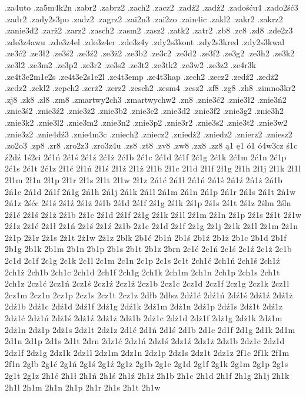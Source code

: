 {.za4uto
.za5m4k2n
.zabr2
.zabrz2
.zach2
.zacz2
.zadź2
.zadż2
.zadośću4
.zado2ść3
.zadr2
.zady2s3po
.zadz2
.zagrz2
.zai2n3
.zai2zo
.zain4ic
.zakl2
.zakr2
.zakrz2
.zanie3d2
.zarż2
.zarz2
.zasch2
.zasm2
.zasz2
.zatk2
.zatr2
.zb8
.zc8
.zd8
.zde2z3
.zde3z4awu
.zde3z4el
.zde3z4er
.zde3z4y
.zdy2s3kont
.zdy2s3kred
.zdy2s3kwal
.ze3ć2
.ze3ł2
.ze3ś2
.ze3ź2
.ze3ż2
.ze3b2
.ze3c2
.ze3d2
.ze3f2
.ze3g2
.ze3h2
.ze3k2
.ze3l2
.ze3m2
.ze3p2
.ze3r2
.ze3s2
.ze3t2
.ze3tk2
.ze3w2
.ze3z2
.ze4r3k
.ze4t3e2m1e2s
.ze4t3e2s1e2l
.ze4t3emp
.ze4t3hap
.zech2
.zecz2
.zedź2
.zedż2
.zedz2
.zekl2
.zepch2
.zerż2
.zerz2
.zesch2
.zesm4
.zesz2
.zf8
.zg8
.zh8
.zimno3kr2
.zj8
.zk8
.zl8
.zm8
.zmartwy2ch3
.zmartwychw2
.zn8
.znie3ć2
.znie3ł2
.znie3ń2
.znie3ś2
.znie3ź2
.znie3ż2
.znie3b2
.znie3c2
.znie3d2
.znie3f2
.znie3g2
.znie3h2
.znie3k2
.znie3l2
.znie3m2
.znie3n2
.znie3p2
.znie3r2
.znie3s2
.znie3t2
.znie3w2
.znie3z2
.znie4dź3
.znie4m3c
.zniech2
.zniecz2
.zniedż2
.zniedz2
.znierz2
.zniesz2
.zo2o3
.zp8
.zr8
.zro2z3
.zro3z4u
.zs8
.zt8
.zv8
.zw8
.zx8
.zz8
ą1
ę1
ó1
ó4w3cz
ś1c
ź2dź
1ś2ci
2ć1ń
2ć1ś
2ć1ź
2ć1ż
2ć1b
2ć1c
2ć1d
2ć1f
2ć1g
2ć1k
2ć1m
2ć1n
2ć1p
2ć1s
2ć1t
2ć1z
2ł1ć
2ł1ń
2ł1ś
2ł1ź
2ł1ż
2ł1b
2ł1c
2ł1d
2ł1f
2ł1g
2ł1h
2ł1j
2ł1k
2ł1l
2ł1m
2ł1n
2ł1p
2ł1r
2ł1s
2ł1t
2ł1w
2ł1z
2ń1ć
2ń1ł
2ń1ń
2ń1ś
2ń1ź
2ń1ż
2ń1b
2ń1c
2ń1d
2ń1f
2ń1g
2ń1h
2ń1j
2ń1k
2ń1l
2ń1m
2ń1n
2ń1p
2ń1r
2ń1s
2ń1t
2ń1w
2ń1z
2śćc
2ś1ś
2ś1ź
2ś1ż
2ś1b
2ś1d
2ś1f
2ś1g
2ś1k
2ś1p
2ś1s
2ś1t
2ś1z
2ślm
2śln
2ź1ć
2ź1ś
2ź1ż
2ź1b
2ź1c
2ź1d
2ź1f
2ź1g
2ź1k
2ź1l
2ź1m
2ź1n
2ź1p
2ź1s
2ź1t
2ź1w
2ź1z
2ż1ć
2ż1ł
2ż1ń
2ż1ś
2ż1ź
2ż1b
2ż1c
2ż1d
2ż1f
2ż1g
2ż1j
2ż1k
2ż1l
2ż1m
2ż1n
2ż1p
2ż1r
2ż1s
2ż1t
2ż1w
2ż1z
2błk
2b1ć
2b1ń
2b1ś
2b1ź
2b1ż
2b1c
2b1d
2b1f
2b1g
2b1k
2b1m
2b1n
2b1p
2b1s
2b1t
2b1z
2brn
2c1ć
2c1ń
2c1ś
2c1ź
2c1ż
2c1b
2c1d
2c1f
2c1g
2c1k
2c1l
2c1m
2c1n
2c1p
2c1s
2c1t
2ch1ć
2ch1ń
2ch1ś
2ch1ź
2ch1ż
2ch1b
2ch1c
2ch1d
2ch1f
2ch1g
2ch1k
2ch1m
2ch1n
2ch1p
2ch1s
2ch1t
2ch1z
2cz1ć
2cz1ń
2cz1ś
2cz1ź
2cz1ż
2cz1b
2cz1c
2cz1d
2cz1f
2cz1g
2cz1k
2cz1l
2cz1m
2cz1n
2cz1p
2cz1s
2cz1t
2cz1z
2dłb
2dłsz
2dź1ć
2dź1ń
2dź1ś
2dź1ź
2dź1ż
2dź1b
2dź1c
2dź1d
2dź1f
2dź1g
2dź1k
2dź1m
2dź1n
2dź1p
2dź1s
2dź1t
2dź1z
2dż1ć
2dż1ń
2dż1ś
2dż1ź
2dż1ż
2dż1b
2dż1c
2dż1d
2dż1f
2dż1g
2dż1k
2dż1m
2dż1n
2dż1p
2dż1s
2dż1t
2dż1z
2d1ć
2d1ń
2d1ś
2d1b
2d1c
2d1f
2d1g
2d1k
2d1m
2d1n
2d1p
2d1s
2d1t
2drn
2dz1ć
2dz1ń
2dz1ś
2dz1ź
2dz1ż
2dz1b
2dz1c
2dz1d
2dz1f
2dz1g
2dz1k
2dz1l
2dz1m
2dz1n
2dz1p
2dz1s
2dz1t
2dz1z
2f1c
2f1k
2f1m
2f1n
2głb
2g1ć
2g1ń
2g1ś
2g1ź
2g1ż
2g1b
2g1c
2g1d
2g1f
2g1k
2g1m
2g1p
2g1s
2g1t
2g1z
2h1ć
2h1ł
2h1ń
2h1ś
2h1ź
2h1ż
2h1b
2h1c
2h1d
2h1f
2h1g
2h1j
2h1k
2h1l
2h1m
2h1n
2h1p
2h1r
2h1s
2h1t
2h1w
}
